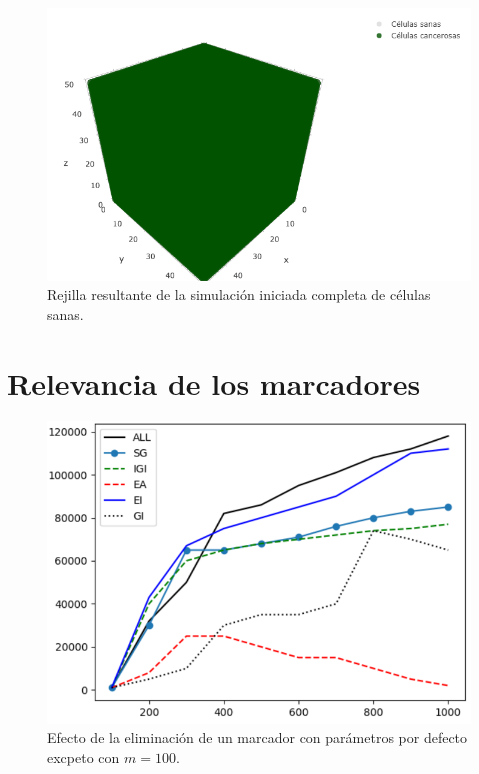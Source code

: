 \begin{figure}[h]
\centering
\includegraphics[scale=0.6]{figures/experiments/exp5/grid}
\caption{Rejilla resultante de la simulación iniciada completa de células sanas.}
\end{figure}

\section{Relevancia de los marcadores}

\begin{figure}[h]
\centering
\includegraphics[scale=0.8]{figures/experiments/exp7/exp7-1}
\caption{Efecto de la eliminación de un marcador con parámetros por defecto excpeto con $m = 100$.}
\end{figure}

